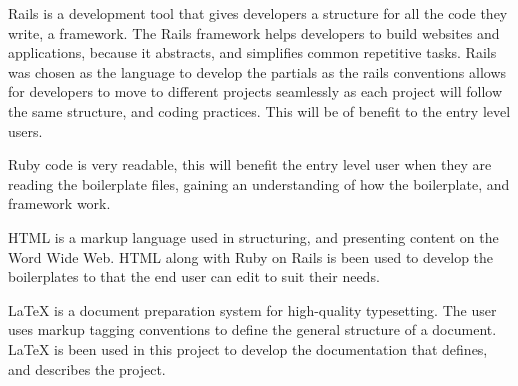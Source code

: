 Rails is a development tool that gives developers a structure for all the code they write, a framework. The Rails framework helps developers to build websites and applications, because it abstracts, and simplifies common repetitive tasks. Rails was chosen as the language to develop the partials as the rails conventions allows for developers to move to different projects seamlessly as each project will follow the same structure, and coding practices. This will be of benefit to the entry level users. 

Ruby code is very readable, this will benefit the entry level user when they are reading the boilerplate files, gaining an understanding of how the boilerplate, and framework work. 

HTML is a markup language used in structuring, and presenting content on the Word Wide Web. HTML along with Ruby on Rails is been used to develop the boilerplates to that the end user can edit to suit their needs. 

LaTeX is a document preparation system for high-quality typesetting. The user uses markup tagging conventions to define the general structure of a document. LaTeX is been used in this project to develop the documentation that defines, and describes the project.

